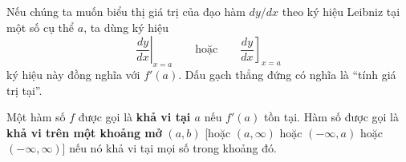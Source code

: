 \begin{minipage}[t]{0.71\textwidth}
    \noindent Nếu chúng ta muốn biểu thị giá trị của đạo hàm $dy/dx$ theo ký hiệu Leibniz tại một số cụ thể $a$, ta dùng ký hiệu
    \[
    \left.\frac{dy}{dx}\right|_{x=a} \qquad \text{hoặc} \qquad \left.\frac{dy}{dx}\right]_{x=a}
    \]
    ký hiệu này đồng nghĩa với $f'(a)$. Dấu gạch thẳng đứng có nghĩa là ``tính giá trị tại''.

    \vspace{0.8em}
    \begin{definitionbox}
    \noindent\setlength{\fboxrule}{0.9pt}\setlength{\fboxsep}{2.5pt}\hspace{0.8em}Một hàm số $f$ được gọi là \textbf{khả vi tại $a$} nếu $f'(a)$ tồn tại. Hàm số được gọi là \textbf{khả vi trên một khoảng mở} $(a, b)$ [hoặc $(a, \infty)$ hoặc $(-\infty, a)$ hoặc $(-\infty, \infty)$] nếu nó khả vi tại mọi số trong khoảng đó.
    \end{definitionbox}
\end{minipage}

